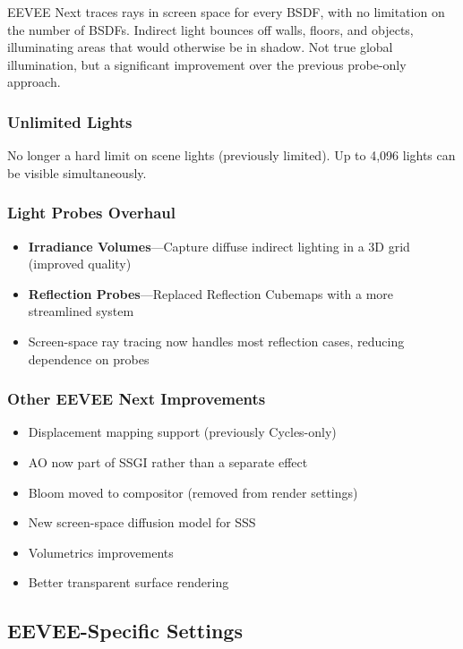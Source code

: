 EEVEE Next traces rays in screen space for every BSDF, with no
limitation on the number of BSDFs. Indirect light bounces off
walls, floors, and objects, illuminating areas that would otherwise
be in shadow. Not true global illumination, but a significant
improvement over the previous probe-only approach.

\subsubsection{Unlimited Lights}

No longer a hard limit on scene lights (previously limited). Up to
4,096 lights can be visible simultaneously.

\subsubsection{Light Probes Overhaul}

\begin{itemize}[leftmargin=2em]
  \item \textbf{Irradiance Volumes}---Capture diffuse indirect lighting
        in a 3D grid (improved quality)
  \item \textbf{Reflection Probes}---Replaced Reflection Cubemaps
        with a more streamlined system
  \item Screen-space ray tracing now handles most reflection cases,
        reducing dependence on probes
\end{itemize}

\subsubsection{Other EEVEE Next Improvements}

\begin{itemize}[leftmargin=2em]
  \item Displacement mapping support (previously Cycles-only)
  \item AO now part of SSGI rather than a separate effect
  \item Bloom moved to compositor (removed from render settings)
  \item New screen-space diffusion model for SSS
  \item Volumetrics improvements
  \item Better transparent surface rendering
\end{itemize}

\subsection{EEVEE-Specific Settings}

